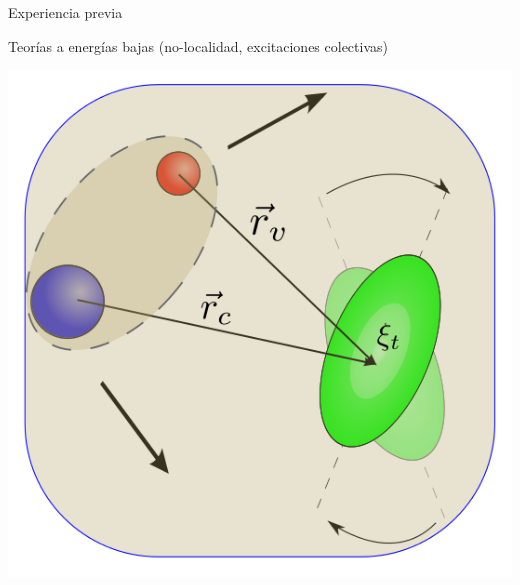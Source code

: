 \documentclass{beamer}
\begin{document}
\begin{frame}{Experiencia previa}
\begin{minipage}{0.45\textwidth}
    \end{minipage}

    \begin{center}
    \begin{minipage}{0.45\textwidth}
     \tiny Teorías a energías bajas (no-localidad, excitaciones colectivas)    
    
    \includegraphics[height=0.3\textheight, width=\textwidth, keepaspectratio]{TExc.png}
    \end{minipage}
    \end{center}

    
\end{frame}
\end{document}
